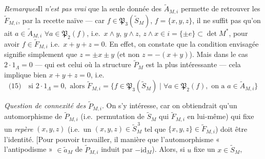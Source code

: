 \documentclass[11pt,a4paper]{article}
\begin{document}
\emph{Remarques}\quad Il \emph{n'est pas vrai} que la seule donnée des $\widetilde{A}_{M,i}$ permette de retrouver les $\widetilde{F}_{M,i}$, par la recette naïve --- car  \ill{} $f\in\mathfrak{P}_3(\widetilde{S}_M)$, $f=\{x,y,z\}$, il ne suffit pas qu'on ait $a\in\widetilde{A}_{M,i}$ $\forall a\in\mathfrak{P}_2(f)$, i.e.\ $x\wedge y$, $y\wedge z$, $z\wedge x\in i=\{\pm e\}\subset\det M^{*}$, pour avoir $f\in\widetilde{F}_{M,i}$ i.e.\ $x+y+z=0$. En effet, on constate que la condition envisagée signifie simplement que $z=\pm x\pm y$ (et non $z=-(x+y)$). Mais dans le cas $2\cdot1_\Lambda=0$ --- qui est celui où \struck{\ill{}} la structure $\widetilde{P}_M$  \struck{\ill{}} est la plus intéressante --- cela implique bien $x+y+z=0$, i.e.
\[
\text{(15)}\quad \text{si } 2\cdot1_\Lambda=0, \text{ alors }
\widetilde{F}_{M,i} = \{f\in\mathfrak{P}_3(\widetilde{S}_M)\mid \forall a\in\mathfrak{P}_2(f), \text{ on a } a\in\widetilde{A}_{M,i}\}
\]

\emph{Question de connexité des} $\widetilde{P}_{M,i}$. On s'y intéresse, car on obtiendrait qu'un automorphisme de $\widetilde{P}_{M,i}$ (i.e.\ permutation de $\widetilde{S}_M$ qui \struck{\ill{}}  $\widetilde{F}_{M,i}$ en lui-même) qui fixe un \emph{repère} $(x,y,z)$ (i.e.\ un $(x,y,z)\in\widetilde{S}_M^{\,3}$ tel que $\{x,y,z\}\in\widetilde{F}_{M,i}$) doit être l'identité. [Pour pouvoir travailler, il \ill{} \ill{} \ill{} manière que l'automorphisme \ill{} « l'antipodisme » $\in\widetilde{a}_M$  de $\widetilde{P}_{M,i}$ \ill{} induit par $-\mathrm{id}_M$). Alors, si $u$ fixe un $x\in\widetilde{S}_M$,
\end{document}
